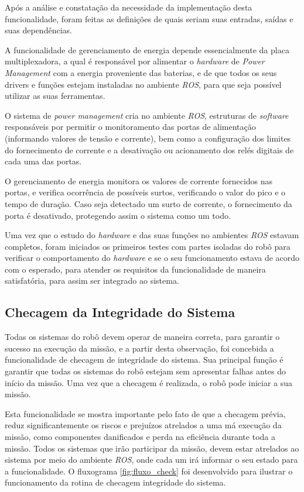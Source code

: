 Após a análise e constatação da necessidade da implementação desta funcionalidade, foram feitas as definições de quais seriam suas entradas, saídas e suas dependências.

A funcionalidade de gerenciamento de energia depende essencialmente da placa multiplexadora, a qual é responsável por alimentar o \textit{hardware} de \textit{Power Management} com a energia proveniente das baterias, e de que todos os seus drivers e funções estejam instaladas no ambiente \textit{ROS}, para que seja possível utilizar as suas ferramentas.

O sistema de \textit{power management} cria no ambiente \textit{ROS}, estruturas de \textit{software} responsáveis por permitir o monitoramento das portas de alimentação (informando valores de tensão e corrente), bem como a configuração dos limites do fornecimento de corrente e a desativação ou acionamento dos relés digitais de cada uma das portas.

O gerenciamento de energia monitora os valores de corrente fornecidos nas portas, e verifica  ocorrência de possíveis surtos, verificando o valor do pico e o tempo de duração. Caso seja detectado um surto de corrente, o fornecimento da porta é desativado, protegendo assim o sistema como um todo.

Uma vez que o estudo do \textit{hardware} e das suas funções no ambientes \textit{ROS} estavam completos, foram iniciados os primeiros testes com partes isoladas do robô para verificar o comportamento do \textit{hardware} e se o seu funcionamento estava de acordo com o esperado, para atender os requisitos da funcionalidade de maneira satisfatória, para assim ser integrado ao sistema.


\subsection{Checagem da Integridade do Sistema}\label{sec:check_sis}
Todas os sistemas do robô devem operar de maneira correta, para garantir o sucesso na execução da missão, e a partir desta observação, foi concebida a funcionalidade de checagem de integridade do sistema. Sua principal função é garantir que todas os sistemas do robô estejam sem apresentar falhas antes do início da missão. Uma vez que a checagem é realizada, o robô pode iniciar a sua missão.

Esta funcionalidade se mostra importante pelo fato de que a checagem prévia, reduz significantemente os riscos e prejuízos atrelados a uma má execução da missão, como componentes danificados e perda na eficiência durante toda a missão. Todos os sistemas que irão participar da missão, devem estar atrelados ao sistema por meio do ambiente \textit{ROS}, onde cada um irá informar o seu estado para a funcionalidade. O fluxograma \ref{fig:fluxo_check} foi desenvolvido para ilustrar o funcionamento da rotina de checagem integridade do sistema.

